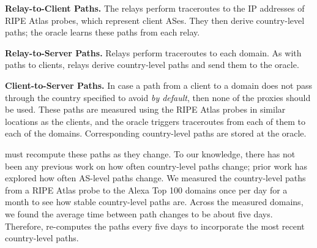 {\bf Relay-to-Client Paths.} The \system{} relays perform
traceroutes to the IP addresses of RIPE Atlas probes, which 
represent client ASes.  They then derive country-level paths; the
oracle learns these paths from each relay.  

{\bf Relay-to-Server Paths.} Relays perform 
traceroutes to each domain.  As with paths to clients,
relays derive country-level paths and send them to the oracle.

{\bf Client-to-Server Paths.} In case a path from a client to a 
domain does not pass through the country specified to avoid {\it by default}, 
then none of the proxies should be used.  
These paths are measured using the RIPE Atlas probes in similar
locations as the clients, and the oracle triggers traceroutes from
each of them to each of the domains.  Corresponding country-level
paths are stored at the oracle.

\system{} must recompute these paths as they change.  To our knowledge, there has not been any previous work 
on how often country-level paths change; prior work has explored how often 
AS-level paths change.  We measured the country-level paths from a RIPE Atlas probe to the 
Alexa Top 100 domains once per day for a month to see how stable country-level paths 
are.  Across the measured domains, we found the average time between path changes to 
be about five days.  Therefore, \system{} re-computes the paths every five days to incorporate the 
most recent country-level paths.  




